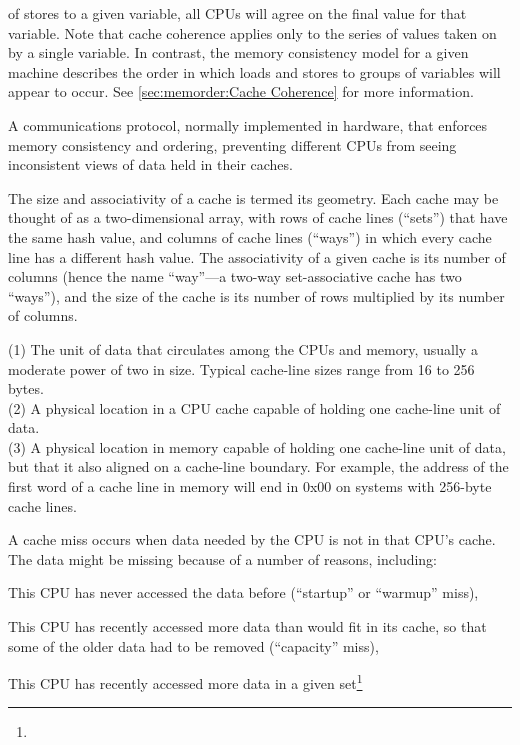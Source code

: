 \begin{description}
	of stores to a given variable, all CPUs will agree
	on the final value for that variable.
	Note that cache coherence applies only to the series of values
	taken on by a single variable.
	In contrast, the memory consistency model for a given machine
	describes the order in which loads and stores to groups of
	variables will appear to occur.
	See \cref{sec:memorder:Cache Coherence}
	for more information.
\item[\IXG{Cache-Coherence Protocol}:]
	A communications protocol, normally implemented in hardware,
	that enforces memory consistency and ordering, preventing
	different CPUs from seeing inconsistent views of data held
	in their caches.
\item[\IXG{Cache Geometry}:]
	The size and associativity of a cache is termed its geometry.
	Each cache may be thought of as a two-dimensional array,
	with rows of cache lines (``sets'') that have the same hash
	value, and columns of cache lines (``ways'') in which every
	cache line has a different hash value.
	The associativity of a given cache is its number of
	columns (hence the name ``way''---a two-way set-associative
	cache has two ``ways''), and the size of the cache is its
	number of rows multiplied by its number of columns.
\item[\IXG{Cache Line}:]
	(1) The unit of data that circulates among the CPUs and memory,
	usually a moderate power of two in size.
	Typical cache-line sizes range from 16 to 256 bytes. \\
	(2) A physical location in a CPU cache capable of holding
	one cache-line unit of data. \\
	(3) A physical location in memory capable of holding one
	cache-line unit of data, but that it also aligned
	on a cache-line boundary.
	For example, the address of the first word of a cache line
	in memory will end in 0x00 on systems with 256-byte cache lines.
\item[\IXG{Cache Miss}:]
	A cache miss occurs when data needed by the CPU is not in
	that CPU's cache.
	The data might be missing because of a number of reasons,
	including:
	\begin{enumerate*}[(1)]
	\item This CPU has never accessed the data before
	(``startup'' or ``warmup'' miss),
	\item This CPU has recently accessed more
	data than would fit in its cache, so that some of the older
	data had to be removed (``capacity'' miss),
	\item This CPU
	has recently accessed more data in a given set\footnote{
}
\end{enumerate*}
\end{description}
